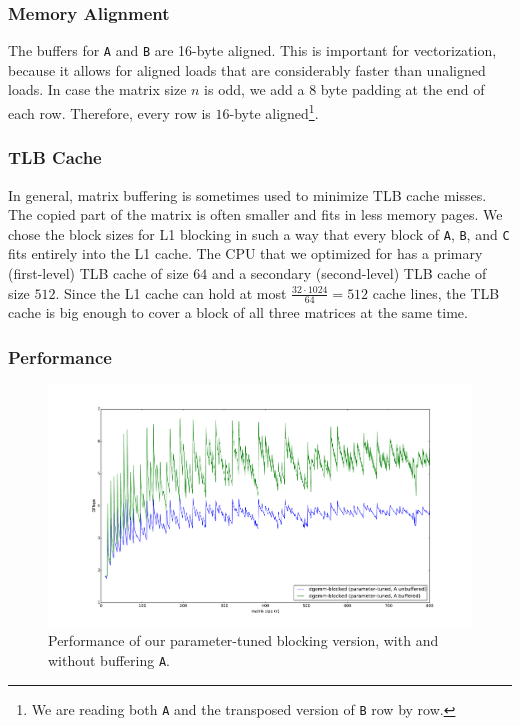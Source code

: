 \documentclass[12pt]{article}
\begin{document}
\subsubsection{Memory Alignment}
The buffers for \lstinline{A} and \lstinline{B} are 16-byte aligned. This is important for vectorization, because it allows for aligned loads that are considerably faster than unaligned loads. In case the matrix size $n$ is odd, we add a $8$ byte padding at the end of each row. Therefore, every row is $16$-byte aligned\footnote{We are reading both \lstinline{A} and the transposed version of \lstinline{B} row by row.}.

\subsubsection{TLB Cache}
In general, matrix buffering is sometimes used to minimize TLB cache misses. The copied part of the matrix is often smaller and fits in less memory pages. We chose the block sizes for L1 blocking in such a way that every block of \lstinline{A}, \lstinline{B}, and \lstinline{C} fits entirely into the L1 cache. The CPU that we optimized for has a primary (first-level) TLB cache of size $64$ and a secondary (second-level) TLB cache of size $512$. Since the L1 cache can hold at most $\frac{32 \cdot 1024}{64} = 512$ cache lines, the TLB cache is big enough to cover a block of all three matrices at the same time.

\subsubsection{Performance}
\begin{figure}
	\includegraphics[width=\textwidth]{graphs/profiles/PROFILE_NO_BUFFER_A.pdf}
	\caption{Performance of our parameter-tuned blocking version, with and without buffering \lstinline{A}.}
	\label{fig:bufferA}
\end{figure}
\end{document}
